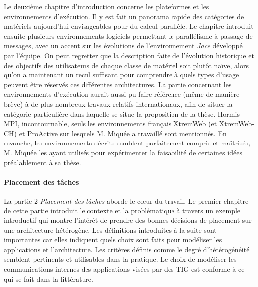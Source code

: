 \documentclass[a4paper,12pt]{article}
\begin{document}
Le deuxième chapitre d'introduction concerne les plateformes et les
environnements d'exécution. Il y est fait un panorama rapide des catégories 
de matériels aujourd'hui envisageables pour du calcul parallèle. Le chapitre 
introduit ensuite plusieurs environnements logiciels permettant le parallélisme 
à passage de messages, avec un accent sur les évolutions de l'environnement 
\textit{Jace} développé par l'équipe. On peut regretter que la description faite 
de l'évolution historique et des objectifs des utilisateurs de chaque classe 
de matériel soit plutôt naïve, alors qu'on a maintenant un recul suffisant pour 
comprendre à quels types d'usage peuvent être réservés ces différentes architectures. 
La partie concernant les environnements d'exécution aurait aussi pu faire référence (même 
de manière brève) à de plus nombreux travaux relatifs internationaux, afin de 
situer la catégorie particulière dans laquelle se situe la proposition de la thèse. 
Hormis MPI, incontournable, seuls les environnements français XtremWeb (et XtremWeb-CH)
et ProActive sur lesquels M. Miquée a travaillé sont mentionnés. En revanche, les 
environnements décrits semblent parfaitement compris et maîtrisés, M. Miquée les 
ayant utilisés pour expérimenter la faisabilité de certaines idées préalablement 
à sa thèse. 


\paragraph*{Placement des tâches}

La partie 2 \textit{Placement des tâches} aborde le c{\oe}ur du travail.
Le premier chapitre de cette partie introduit le contexte et la problématique
à travers un exemple introductif qui montre l'intérêt de prendre des bonnes
décisions de placement sur une architecture hétérogène. Les définitions
introduites à la suite sont importantes car elles indiquent quels choix
sont faits pour modéliser les applications et l'architecture. Les critères
définis comme le degré d'hétérogénéité semblent pertinents et utilisables
dans la pratique. Le choix de modéliser les communications internes des
applications visées par des TIG est conforme à ce qui se fait dans la
littérature.
\end{document}

